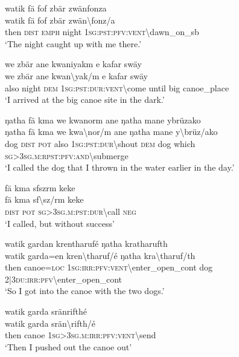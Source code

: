 \ea\label{ex:13:a1432}
watik fä fof zbär zwänfonza\\
\gll watik	fä	fof	zbär	zwän{\textbackslash}fonz/a\\
     then	\textsc{dist}	\textsc{emph}	night	1\textsc{sg}:\textsc{pst}:\textsc{pfv}:\textsc{vent}{\textbackslash}dawn\_on\_sb\\
\glt `The night caught up with me there.'
\z

\ea\label{ex:13:a1434}
we zbär ane kwaniyakm e kafar swäy\\
\gll we	zbär	ane	kwan{\textbackslash}yak/m	e	kafar	swäy\\
     also	night	\textsc{dem}	1\textsc{sg}:\textsc{pst}:\textsc{dur}:\textsc{vent}{\textbackslash}come	until	big	canoe\_place\\
\glt `I arrived at the big canoe site in the dark.'
\z

\ea\label{ex:13:a1435}
ŋatha fä kma we kwanorm ane ŋatha mane ybrüzako\\
\gll ŋatha	fä	kma	we	kwa{\textbackslash}nor/m	ane	ŋatha	mane	y{\textbackslash}brüz/ako\\
     dog	\textsc{dist}	\textsc{pot}	also	1\textsc{sg}:\textsc{pst}:\textsc{dur}{\textbackslash}shout	\textsc{dem}	dog	which	\textsc{sg}>3\textsc{sg}.\textsc{m}:\textsc{rpst}:\textsc{pfv}:\textsc{and}{\textbackslash}submerge\\
\glt `I called the dog that I thrown in the water earlier in the day.'
\z

\ea\label{ex:13:a1436}
fä kma sfszrm keke\\
\gll fä	kma	sf{\textbackslash}sz/rm	keke\\
     \textsc{dist}	\textsc{pot}	\textsc{sg}>3\textsc{sg}.\textsc{m}:\textsc{pst}:\textsc{dur}{\textbackslash}call	\textsc{neg}\\
\glt `I called, but without success'
\z

\ea\label{ex:13:a1437}
watik gardan krentharufé ŋatha kratharufth\\
\gll watik	garda=en	kren{\textbackslash}tharuf/é	ŋatha	kra{\textbackslash}tharuf/th\\
     then	canoe=\textsc{loc}	1\textsc{sg}:\textsc{irr}:\textsc{pfv}:\textsc{vent}{\textbackslash}enter\_open\_cont	dog	2|3\textsc{du}:\textsc{irr}:\textsc{pfv}{\textbackslash}enter\_open\_cont\\
\glt `So I got into the canoe with the two dogs.'
\z

\ea\label{ex:13:a1439}
watik garda sränrifthé\\
\gll watik	garda	srän{\textbackslash}rifth/é\\
     then	canoe	1\textsc{sg}>3\textsc{sg}.\textsc{m}:\textsc{irr}:\textsc{pfv}:\textsc{vent}{\textbackslash}send\\
\glt `Then I pushed out the canoe out'
\z

